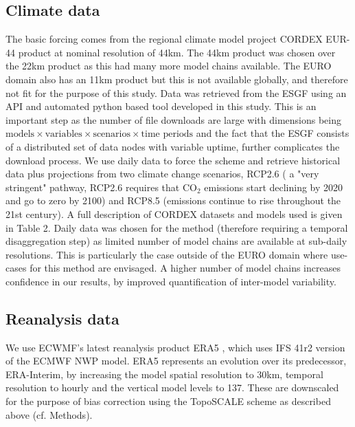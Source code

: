 \documentclass[hess, manuscript]{copernicus}
\begin{document}
\subsection{Climate data}
The basic forcing comes from the regional climate model project CORDEX EUR-44 product \citep{Jacob2014-yw} at nominal resolution of 44\unit{km}. The 44\unit{km} product was chosen over the 22\unit{km} product as this had many more model chains available. The EURO domain also has an 11\unit{km} product but this is not available globally, and therefore not fit for the purpose of this study. Data was retrieved from the ESGF using an API and automated python based tool developed in this study. This is an important step as the number of file downloads are large with dimensions being $\text{models}\times\text{variables}\times\text{scenarios}\times\text{time periods}$
and the fact that the ESGF consists of a distributed set of data nodes with variable uptime, further complicates the download process. 
We use daily data to force the scheme and retrieve historical data plus projections from two climate change scenarios, RCP2.6 ( a "very stringent" pathway, RCP2.6 requires that  $\text{CO}_2$ emissions start declining by 2020 and go to zero by 2100) and RCP8.5 (emissions continue to rise throughout the 21st century). A full description of CORDEX datasets and models used is given in Table 2. Daily data was chosen for the method (therefore requiring a temporal disaggregation step) as limited number of model chains are available at sub-daily resolutions. This is particularly the case outside of the EURO domain where use-cases for this method are envisaged. A higher number of model chains increases confidence in our results, by improved quantification of inter-model variability. 

\subsection{Reanalysis data}
We use ECWMF's latest reanalysis product ERA5 \citep{Hersbach2020-ze}, which uses IFS 41r2 version of the ECMWF NWP model. ERA5 represents an evolution over its predecessor, ERA-Interim, by increasing the model spatial resolution to 30\unit{km}, temporal resolution to hourly and the vertical model levels to 137. These are downscaled for the purpose of bias correction using the TopoSCALE scheme \citep{Fiddes2014-wt} as described above (cf. Methods). %
\end{document}
